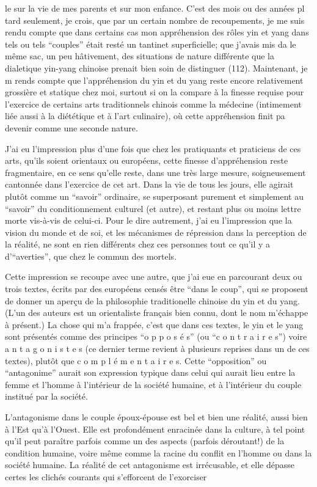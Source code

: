 le sur la vie de mes parents et sur mon enfance. C'est des mois ou des années pl tard seulement, je crois, que par un certain nombre de recoupements, je me suis rendu compte que dans certains cas mon appréhension des rôles yin et yang dans tels ou tels ``couples'' était resté un tantinet superficielle; que j'avais mis da le même sac, un peu hâtivement, des situations de nature différente que la dialetique yin-yang chinoise prenait bien soin de distinguer (112). Maintenant, je m rends compte que l'appréhension du yin et du yang reste encore relativement grossière et statique chez moi, surtout si on la compare à la finesse requise pour l'exercice de certains arts traditionnels chinois comme la médecine (intimement liée aussi à la diététique et à l'art culinaire), où cette appréhension finit pa devenir comme une seconde nature.

J'ai eu l'impression plus d'une fois que chez les pratiquants et praticiens de ces arts, qu'ils soient orientaux ou européens, cette finesse d'appréhension reste fragmentaire, en ce sens qu'elle reste, dans une très large mesure, soigneusement cantonnée dans l'exercice de cet art. Dans la vie de tous les jours, elle agirait plutôt comme un ``savoir'' ordinaire, se superposant purement et simplement au ``savoir'' du conditionnement culturel (et autre), et restant plus ou moins lettre morte vis-à-vis de celui-ci. Pour le dire autrement, j'ai eu l'impression que la vision du monde et de soi, et les mécanismes de répression dans la perception de la réalité, ne sont en rien différents chez ces personnes tout ce qu'il y a d'``averties'', que chez le commun des mortels.

Cette impression se recoupe avec une autre, que j'ai eue en parcourant deux ou trois textes, écrits par des européens censés être ``dans le coup'', qui se proposent de donner un aperçu de la philosophie traditionelle chinoise du yin et du yang. (L'un des auteurs est un orientaliste français bien connu, dont le nom m'échappe à présent.) La chose qui m'a frappée, c'est que dans ces textes, le yin et le yang sont présentés comme des principes ``o p p o s é s'' (ou ``c o n t r a i r e s'') voire a n t a g o n i s t e s (ce dernier terme revient à plusieurs reprises dans un de ces textes), plutôt que c o m p l é m e n t a i r e s. Cette ``opposition'' ou ``antagonime'' aurait son expression typique dans celui qui aurait lieu entre la femme et l'homme à l'intérieur de la société humaine, et à l'intérieur du couple institué par la société.

L'antagonisme dans le couple époux-épouse est bel et bien une réalité, aussi bien à l'Est qu'à l'Ouest. Elle est profondément enracinée dans la culture, à tel point qu'il peut paraître parfois comme un des aspects (parfois déroutant!) de la condition humaine, voire même comme la racine du conflit en l'homme ou dans la société humaine. La réalité de cet antagonisme est irrécusable, et elle dépasse certes les clichés courants qui s'efforcent de l'exorciser


